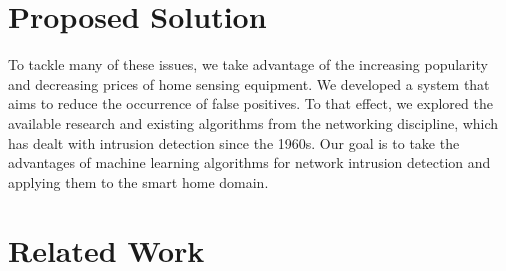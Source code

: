 \section{Proposed Solution}
To tackle many of these issues, we take advantage of the increasing popularity and decreasing prices of home sensing equipment. We developed a system that aims to reduce the occurrence of false positives. To that effect, we explored the available research and existing algorithms from the networking discipline, which has dealt with intrusion detection since the 1960s. Our goal is to take the advantages of machine learning algorithms for network intrusion detection and applying them to the smart home domain.


\section{Related Work}
\label{related_work}

